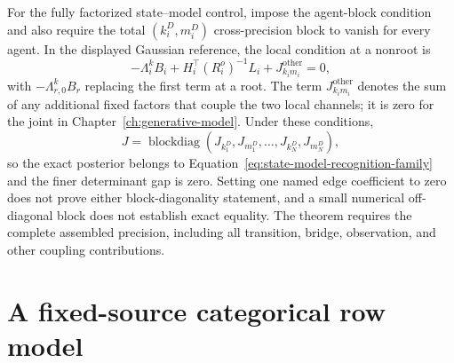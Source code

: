 For the fully factorized state--model control, impose the agent-block condition and also require the total \((k_i^D,m_i^D)\) cross-precision block to vanish for every agent. In the displayed Gaussian reference, the local condition at a nonroot is
\begin{equation}
-\Lambda_i^kB_i
+H_i^\top(R_i^o)^{-1}L_i
+J_{k_i m_i}^{\mathrm{other}}=0,
\label{eq:fully-factorized-local-cross-precision-control}
\end{equation}
with \(-\Lambda_{r,0}^kB_r\) replacing the first term at a root. The term \(J_{k_i m_i}^{\mathrm{other}}\) denotes the sum of any additional fixed factors that couple the two local channels; it is zero for the joint in Chapter~\ref{ch:generative-model}. Under these conditions,
\begin{equation}
J=\operatorname{blockdiag}
\left(J_{k_1^D},J_{m_1^D},\ldots,J_{k_N^D},J_{m_N^D}\right),
\label{eq:fully-factorized-zero-coupling-precision}
\end{equation}
so the exact posterior belongs to Equation~\eqref{eq:state-model-recognition-family} and the finer determinant gap is zero. Setting one named edge coefficient to zero does not prove either block-diagonality statement, and a small numerical off-diagonal block does not establish exact equality. The theorem requires the complete assembled precision, including all transition, bridge, observation, and other coupling contributions.

\section{A fixed-source categorical row model}

